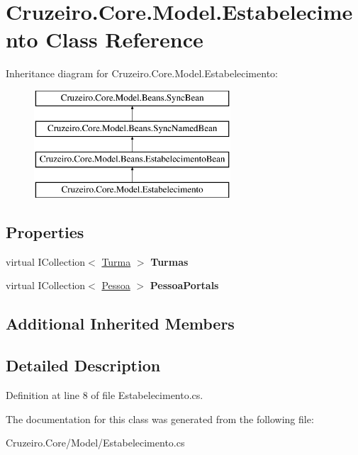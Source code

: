 \hypertarget{class_cruzeiro_1_1_core_1_1_model_1_1_estabelecimento}{}\section{Cruzeiro.\+Core.\+Model.\+Estabelecimento Class Reference}
\label{class_cruzeiro_1_1_core_1_1_model_1_1_estabelecimento}
Inheritance diagram for Cruzeiro.\+Core.\+Model.\+Estabelecimento\+:\begin{figure}[H]
\begin{center}
\leavevmode
\includegraphics[height=4.000000cm]{class_cruzeiro_1_1_core_1_1_model_1_1_estabelecimento}
\end{center}
\end{figure}
\subsection*{Properties}
\begin{DoxyCompactItemize}
\item 
virtual I\+Collection$<$ \hyperlink{class_cruzeiro_1_1_core_1_1_model_1_1_turma}{Turma} $>$ {\bfseries Turmas}\hypertarget{class_cruzeiro_1_1_core_1_1_model_1_1_estabelecimento_a0a038b83224a60687c93c840831fd8a9}{}\label{class_cruzeiro_1_1_core_1_1_model_1_1_estabelecimento_a0a038b83224a60687c93c840831fd8a9}

\item 
virtual I\+Collection$<$ \hyperlink{class_cruzeiro_1_1_core_1_1_model_1_1_pessoa}{Pessoa} $>$ {\bfseries Pessoa\+Portals}\hypertarget{class_cruzeiro_1_1_core_1_1_model_1_1_estabelecimento_aed2840eb7751f36b9325d7c9b3a1ac87}{}\label{class_cruzeiro_1_1_core_1_1_model_1_1_estabelecimento_aed2840eb7751f36b9325d7c9b3a1ac87}

\end{DoxyCompactItemize}
\subsection*{Additional Inherited Members}


\subsection{Detailed Description}


Definition at line 8 of file Estabelecimento.\+cs.



The documentation for this class was generated from the following file\+:\begin{DoxyCompactItemize}
\item 
Cruzeiro.\+Core/\+Model/Estabelecimento.\+cs\end{DoxyCompactItemize}
